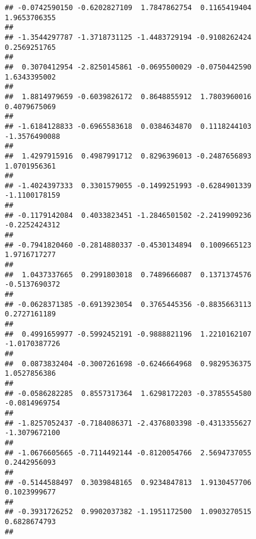 \documentclass[]{article}
\begin{document}
\begin{verbatim}
## -0.0742590150 -0.6202827109  1.7847862754  0.1165419404  1.9653706355 
##                                                                       
## -1.3544297787 -1.3718731125 -1.4483729194 -0.9108262424  0.2569251765 
##                                                                       
##  0.3070412954 -2.8250145861 -0.0695500029 -0.0750442590  1.6343395002 
##                                                                       
##  1.8814979659 -0.6039826172  0.8648855912  1.7803960016  0.4079675069 
##                                                                       
## -1.6184128833 -0.6965583618  0.0384634870  0.1118244103 -1.3576490088 
##                                                                       
##  1.4297915916  0.4987991712  0.8296396013 -0.2487656893  1.0701956361 
##                                                                       
## -1.4024397333  0.3301579055 -0.1499251993 -0.6284901339 -1.1100178159 
##                                                                       
## -0.1179142084  0.4033823451 -1.2846501502 -2.2419909236 -0.2252424312 
##                                                                       
## -0.7941820460 -0.2814880337 -0.4530134894  0.1009665123  1.9716717277 
##                                                                       
##  1.0437337665  0.2991803018  0.7489666087  0.1371374576 -0.5137690372 
##                                                                       
## -0.0628371385 -0.6913923054  0.3765445356 -0.8835663113  0.2727161189 
##                                                                       
##  0.4991659977 -0.5992452191 -0.9888821196  1.2210162107 -1.0170387726 
##                                                                       
##  0.0873832404 -0.3007261698 -0.6246664968  0.9829536375  1.0527856386 
##                                                                       
## -0.0586282285  0.8557317364  1.6298172203 -0.3785554580 -0.0814969754 
##                                                                       
## -1.8257052437 -0.7184086371 -2.4376803398 -0.4313355627 -1.3079672100 
##                                                                       
## -1.0676605665 -0.7114492144 -0.8120054766  2.5694737055  0.2442956093 
##                                                                       
## -0.5144588497  0.3039848165  0.9234847813  1.9130457706  0.1023999677 
##                                                                       
## -0.3931726252  0.9902037382 -1.1951172500  1.0903270515  0.6828674793 
##                                                                       

\end{verbatim}
\end{document}
